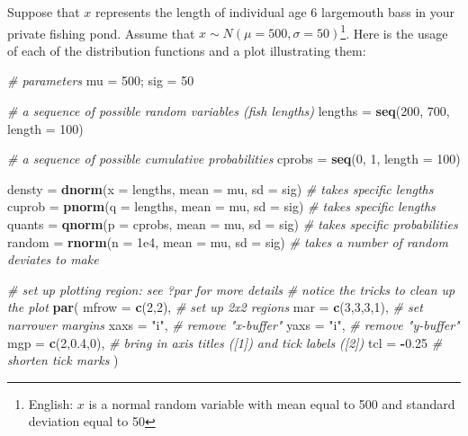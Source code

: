 \documentclass[]{book}
\newenvironment{Shaded}{\begin{snugshade}}{\end{snugshade}}
\newcommand{\KeywordTok}[1]{\textcolor[rgb]{0.13,0.29,0.53}{\textbf{#1}}}
\newcommand{\DataTypeTok}[1]{\textcolor[rgb]{0.13,0.29,0.53}{#1}}
\newcommand{\DecValTok}[1]{\textcolor[rgb]{0.00,0.00,0.81}{#1}}
\newcommand{\FloatTok}[1]{\textcolor[rgb]{0.00,0.00,0.81}{#1}}
\newcommand{\StringTok}[1]{\textcolor[rgb]{0.31,0.60,0.02}{#1}}
\newcommand{\CommentTok}[1]{\textcolor[rgb]{0.56,0.35,0.01}{\textit{#1}}}
\newcommand{\OperatorTok}[1]{\textcolor[rgb]{0.81,0.36,0.00}{\textbf{#1}}}
\newcommand{\NormalTok}[1]{#1}
\let\rmarkdownfootnote\footnote%
\def\footnote{\protect\rmarkdownfootnote}
\theoremstyle{definition}
\theoremstyle{definition}
\theoremstyle{definition}
\theoremstyle{remark}
\begin{document}
Suppose that \(x\) represents the length of individual age 6 largemouth
bass in your private fishing pond. Assume that
\(x \sim N(\mu=500, \sigma=50)\)\footnote{English: \(x\) is a normal
  random variable with mean equal to 500 and standard deviation equal to
  50}. Here is the usage of each of the distribution functions and a
plot illustrating them:

\begin{Shaded}
\begin{Highlighting}[]
\CommentTok{# parameters}
\NormalTok{mu =}\StringTok{ }\DecValTok{500}\NormalTok{; sig =}\StringTok{ }\DecValTok{50}

\CommentTok{# a sequence of possible random variables (fish lengths)}
\NormalTok{lengths =}\StringTok{ }\KeywordTok{seq}\NormalTok{(}\DecValTok{200}\NormalTok{, }\DecValTok{700}\NormalTok{, }\DataTypeTok{length =} \DecValTok{100}\NormalTok{)}

\CommentTok{# a sequence of possible cumulative probabilities}
\NormalTok{cprobs =}\StringTok{ }\KeywordTok{seq}\NormalTok{(}\DecValTok{0}\NormalTok{, }\DecValTok{1}\NormalTok{, }\DataTypeTok{length =} \DecValTok{100}\NormalTok{)}

\NormalTok{densty =}\StringTok{ }\KeywordTok{dnorm}\NormalTok{(}\DataTypeTok{x =}\NormalTok{ lengths, }\DataTypeTok{mean =}\NormalTok{ mu, }\DataTypeTok{sd =}\NormalTok{ sig)  }\CommentTok{# takes specific lengths}
\NormalTok{cuprob =}\StringTok{ }\KeywordTok{pnorm}\NormalTok{(}\DataTypeTok{q =}\NormalTok{ lengths, }\DataTypeTok{mean =}\NormalTok{ mu, }\DataTypeTok{sd =}\NormalTok{ sig)  }\CommentTok{# takes specific lengths}
\NormalTok{quants =}\StringTok{ }\KeywordTok{qnorm}\NormalTok{(}\DataTypeTok{p =}\NormalTok{ cprobs, }\DataTypeTok{mean =}\NormalTok{ mu, }\DataTypeTok{sd =}\NormalTok{ sig)   }\CommentTok{# takes specific probabilities}
\NormalTok{random =}\StringTok{ }\KeywordTok{rnorm}\NormalTok{(}\DataTypeTok{n =} \FloatTok{1e4}\NormalTok{, }\DataTypeTok{mean =}\NormalTok{ mu, }\DataTypeTok{sd =}\NormalTok{ sig)      }\CommentTok{# takes a number of random deviates to make}

\CommentTok{# set up plotting region: see ?par for more details}
\CommentTok{# notice the tricks to clean up the plot}
\KeywordTok{par}\NormalTok{(}
  \DataTypeTok{mfrow =} \KeywordTok{c}\NormalTok{(}\DecValTok{2}\NormalTok{,}\DecValTok{2}\NormalTok{),    }\CommentTok{# set up 2x2 regions}
  \DataTypeTok{mar =} \KeywordTok{c}\NormalTok{(}\DecValTok{3}\NormalTok{,}\DecValTok{3}\NormalTok{,}\DecValTok{3}\NormalTok{,}\DecValTok{1}\NormalTok{),  }\CommentTok{# set narrower margins}
  \DataTypeTok{xaxs =} \StringTok{"i"}\NormalTok{,        }\CommentTok{# remove "x-buffer"}
  \DataTypeTok{yaxs =} \StringTok{"i"}\NormalTok{,        }\CommentTok{# remove "y-buffer"}
  \DataTypeTok{mgp =} \KeywordTok{c}\NormalTok{(}\DecValTok{2}\NormalTok{,}\FloatTok{0.4}\NormalTok{,}\DecValTok{0}\NormalTok{),  }\CommentTok{# bring in axis titles ([1]) and tick labels ([2])}
  \DataTypeTok{tcl =} \OperatorTok{-}\FloatTok{0.25}        \CommentTok{# shorten tick marks}
\NormalTok{)}


\end{Highlighting}
\end{Shaded}
\end{document}
